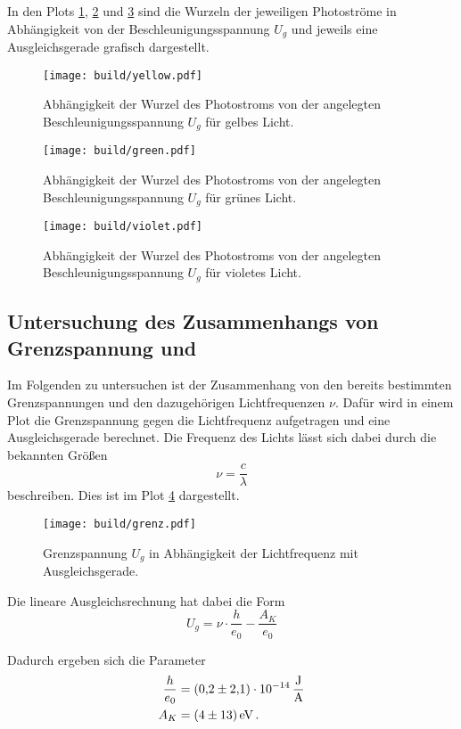 In den Plots \ref{fig:gelb}, \ref{fig:gruen} und \ref{fig:violet} sind die Wurzeln der jeweiligen Photoströme in Abhängigkeit von der 
Beschleunigungsspannung $U_g$ und jeweils eine Ausgleichsgerade grafisch dargestellt.

\begin{figure}
  \centering
  \texttt{[image: build/yellow.pdf]}
  \caption{Abhängigkeit der Wurzel des Photostroms von der angelegten Beschleunigungsspannung $U_g$ für gelbes Licht.}
  \label{fig:gelb}
\end{figure}
\begin{figure}
  \centering
  \texttt{[image: build/green.pdf]}
  \caption{Abhängigkeit der Wurzel des Photostroms von der angelegten Beschleunigungsspannung $U_g$ für grünes Licht.}
  \label{fig:gruen}
\end{figure}
\begin{figure}
  \centering
  \texttt{[image: build/violet.pdf]}
  \caption{Abhängigkeit der Wurzel des Photostroms von der angelegten Beschleunigungsspannung $U_g$ für violetes Licht.}
  \label{fig:violet}
\end{figure}
\FloatBarrier

\subsection{Untersuchung des Zusammenhangs von Grenzspannung und }

Im Folgenden zu untersuchen ist der Zusammenhang von den bereits bestimmten Grenzspannungen und den dazugehörigen Lichtfrequenzen $\nu$.
Dafür wird in einem Plot die Grenzspannung gegen die Lichtfrequenz aufgetragen und eine Ausgleichsgerade berechnet. Die Frequenz des Lichts
lässt sich dabei durch die bekannten Größen
\begin{equation}
    \nu = \frac{c}{\lambda}
\end{equation}
beschreiben.
Dies ist im Plot \ref{fig:rip} dargestellt.
\begin{figure}
    \centering
    \texttt{[image: build/grenz.pdf]}
    \caption{Grenzspannung $U_g$ in Abhängigkeit der Lichtfrequenz mit Ausgleichsgerade.}
    \label{fig:rip}
\end{figure}
\FloatBarrier

Die lineare Ausgleichsrechnung hat dabei die Form 
\begin{equation}
    U_g = \nu\cdot \frac{h}{e_0} - \frac{A_K}{e_0}
\end{equation}

Dadurch ergeben sich die Parameter 
\begin{align*}
    \frac{h}{e_0} &= \SI{0.2(21)e-14}{\frac{\joule}{\ampere}} \\
    A_K           &= \SI{04(13)}{\electronvolt}\,.
\end{align*}
